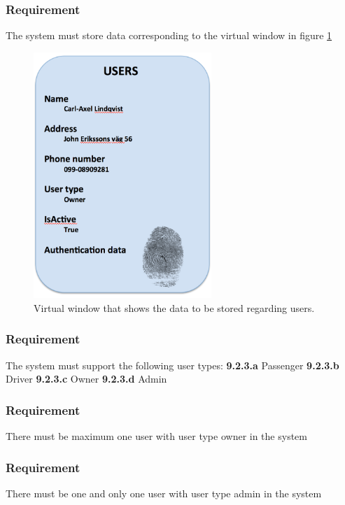 \documentclass{article}
\begin{document}
{      \subsubsection{Requirement}
\hfill \break 
\- \- \-The system must store data corresponding to the virtual window in figure \ref{vw1}
\begin{figure}[htb]   
 \centering
 \includegraphics[width=0.6\textwidth]
    {VirtualWindow1.png}
  \caption{Virtual window that shows the data to be stored regarding users.}
  \label{vw1}
\end{figure}
\bigskip
      \subsubsection{Requirement}
\hfill \break 
\- \- \-The system must support the following user types:
\hfill \break 
\indent
\textbf{9.2.3.a} Passenger
\hfill \break 
\indent
\textbf{9.2.3.b} Driver
\hfill \break 
\indent
\textbf{9.2.3.c} Owner
\hfill \break 
\indent
\textbf{9.2.3.d} Admin
      \subsubsection{Requirement}
\hfill \break 
\- \- \-There must be maximum one user with user type owner in the system
      \subsubsection{Requirement}
\hfill \break 
\- \- \-There must be one and only one user with user type admin in the system
}
\end{document}
